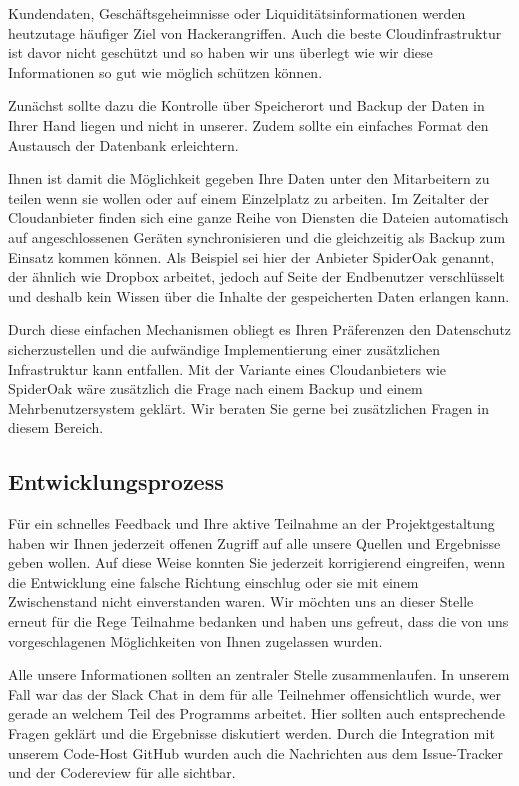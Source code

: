 \documentclass[12pt]{article}
\begin{document}
Kundendaten, Geschäftsgeheimnisse oder Liquiditätsinformationen werden heutzutage häufiger Ziel von Hackerangriffen. Auch die beste Cloudinfrastruktur ist davor nicht geschützt und so haben wir uns überlegt wie wir diese Informationen so gut wie möglich schützen können.
\newline

Zunächst sollte dazu die Kontrolle über Speicherort und Backup der Daten in Ihrer Hand liegen und nicht in unserer. Zudem sollte ein einfaches Format den Austausch der Datenbank erleichtern.
\newline

Ihnen ist damit die Möglichkeit gegeben Ihre Daten unter den Mitarbeitern zu teilen wenn sie wollen oder auf einem Einzelplatz zu arbeiten. Im Zeitalter der Cloudanbieter finden sich eine ganze Reihe von Diensten die Dateien automatisch auf angeschlossenen Geräten synchronisieren und die gleichzeitig als Backup zum Einsatz kommen können. Als Beispiel sei hier der Anbieter SpiderOak genannt, der ähnlich wie Dropbox arbeitet, jedoch auf Seite der Endbenutzer verschlüsselt und deshalb kein Wissen über die Inhalte der gespeicherten Daten erlangen kann.
\newline 

Durch diese einfachen Mechanismen obliegt es Ihren Präferenzen den Datenschutz sicherzustellen und die aufwändige Implementierung einer zusätzlichen Infrastruktur kann entfallen. Mit der Variante eines Cloudanbieters wie SpiderOak wäre zusätzlich die Frage nach einem Backup und einem Mehrbenutzersystem geklärt. Wir beraten Sie gerne bei zusätzlichen Fragen in diesem Bereich.

\subsection{Entwicklungsprozess}

Für ein schnelles Feedback und Ihre aktive Teilnahme an der Projektgestaltung haben wir Ihnen jederzeit offenen Zugriff auf alle unsere Quellen und Ergebnisse geben wollen. Auf diese Weise konnten Sie jederzeit korrigierend eingreifen, wenn die Entwicklung eine falsche Richtung einschlug oder sie mit einem Zwischenstand nicht einverstanden waren. Wir möchten uns an dieser Stelle erneut für die Rege Teilnahme bedanken und haben uns gefreut, dass die von uns vorgeschlagenen Möglichkeiten von Ihnen zugelassen wurden. 
\newline

Alle unsere Informationen sollten an zentraler Stelle zusammenlaufen. In unserem Fall war das der Slack Chat in dem für alle Teilnehmer offensichtlich wurde, wer gerade an welchem Teil des Programms arbeitet. Hier sollten auch entsprechende Fragen geklärt und die Ergebnisse diskutiert werden. Durch die Integration mit unserem Code-Host GitHub wurden auch die Nachrichten aus dem Issue-Tracker und der Codereview für alle sichtbar.
\newline
\end{document}
